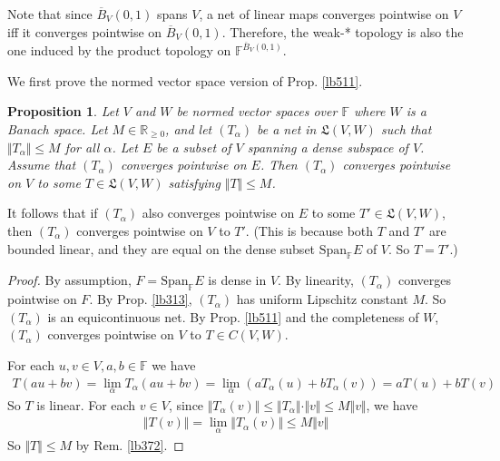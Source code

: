 \documentclass[12pt,b5paper,notitlepage]{article}
\theoremstyle{definition}
\theoremstyle{plain}
\newtheorem{pp}[df]{Proposition}
\newcommand{\fk}{\mathfrak}
\newcommand{\ovl}{\overline}
\newcommand{\Span}{\mathrm{Span}}
\newcommand{\Rbb}{\mathbb R}
\newcommand{\Fbb}{\mathbb F}
\numberwithin{equation}{section}
\begin{document}
Note that since $\ovl B_V(0,1)$ spans $V$, a net of linear maps converges pointwise on $V$ iff it converges pointwise on $\ovl B_V(0,1)$. Therefore, the weak-* topology is also the one induced by the product topology on $\Fbb^{\ovl B_V(0,1)}$.


We first prove the normed vector space version of Prop. \ref{lb511}.


\begin{pp}\label{lb520}
Let $V$ and $W$ be normed vector spaces over $\Fbb$ where $W$ is a Banach space. Let $M\in\Rbb_{\geq0}$, and let $(T_\alpha)$ be a net in $\fk L(V,W)$ such that $\Vert T_\alpha\Vert\leq M$ for all $\alpha$. Let $E$ be a subset of $V$ spanning a dense subspace of $V$. Assume that $(T_\alpha)$ converges pointwise on $E$. Then $(T_\alpha)$ converges pointwise on $V$ to some $T\in\fk L(V,W)$ satisfying $\Vert T\Vert\leq M$.
\end{pp}

It follows that if $(T_\alpha)$ also converges pointwise on $E$ to some $T'\in\fk L(V,W)$, then $(T_\alpha)$ converges pointwise on $V$ to $T'$. (This is because both $T$ and $T'$ are bounded linear, and they are equal on the dense subset $\Span_\Fbb E$ of $V$. So $T=T'$.)

\begin{proof}
By assumption, $F=\Span_\Fbb E$ is dense in $V$. By linearity, $(T_\alpha)$ converges pointwise on $F$. By Prop. \ref{lb313}, $(T_\alpha)$ has uniform Lipschitz constant $M$. So $(T_\alpha)$ is an equicontinuous net. By Prop. \ref{lb511} and the completeness of $W$, $(T_\alpha)$ converges pointwise on $V$ to $T\in C(V,W)$.

For each $u,v\in V,a,b\in\Fbb$ we have
\begin{align*}
T(au+bv)=\lim_\alpha T_\alpha(au+bv)=\lim_\alpha (a T_\alpha(u)+b T_\alpha(v))=a T(u)+b T(v)
\end{align*}
So $T$ is linear. For each $v\in V$, since $\Vert T_\alpha(v)\Vert\leq \Vert T_\alpha\Vert\cdot\Vert v\Vert\leq M \Vert v\Vert$, we have
\begin{align*}
\Vert T(v)\Vert=\lim_\alpha\Vert T_\alpha(v)\Vert\leq M\Vert v\Vert
\end{align*}
So $\Vert T\Vert\leq M$ by Rem. \ref{lb372}.
\end{proof}
\end{document}
